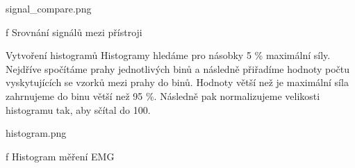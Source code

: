         \midinsert
            \picheight=7cm \cinspic signal_compare.png
            \caption/f Srovnání signálů mezi přístroji
        \endinsert

    \sec Vytvoření histogramů
        Histogramy hledáme pro násobky 5 \% maximální síly. Nejdříve spočítáme prahy jednotlivých binů a následně přiřadíme hodnoty počtu vyskytujících se vzorků mezi prahy do binů. Hodnoty větší než je maximální síla zahrnujeme do binu větší než 95 \%. Následně pak normalizujeme velikosti histogramu tak, aby sčítal do 100.

        \midinsert
            \picheight=7cm \cinspic histogram.png
            \caption/f Histogram měření EMG
        \endinsert
